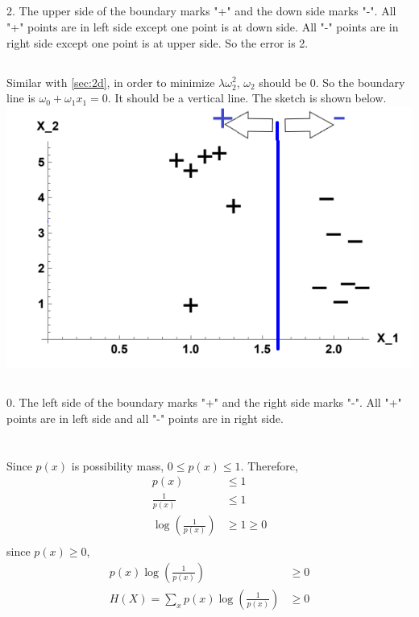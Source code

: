 \documentclass{article}
\begin{document}
\subsection{}
2. The upper side of the boundary marks "+" and the down side marks "-". All "+" points are in left side except one point is at down side. All "-" points are in right side except one point is at upper side. So the error is 2.
\subsection{}
Similar with \ref{sec:2d}, in order to minimize $\lambda\omega_2^2$, $\omega_2$ should be 0. So the boundary line is $\omega_0 + \omega_1x_1 = 0$. It should be a vertical line. The sketch is shown below.\\
\includegraphics{2h.png}
\subsection{}
0. The left side of the boundary marks "+" and the right side marks "-". All "+" points are in left side and all "-" points are in right side.
\section{}
\subsection{}
Since $p(x)$ is possibility mass, $0\leq p(x)\leq 1$. Therefore,
\begin{align*}
    p(x)&\leq 1\\
    \frac{1}{p(x)} &\leq 1\\
    \log (\frac{1}{p(x)}) &\geq 1 \geq 0\\
\end{align*}
since $p(x) \geq 0$,
\begin{align*}
    p(x)\log (\frac{1}{p(x)}) &\geq 0\\
    H(X) = \sum_{x}^{} p(x) \log (\frac{1}{p(x)}) &\geq 0
\end{align*}
\end{document}
